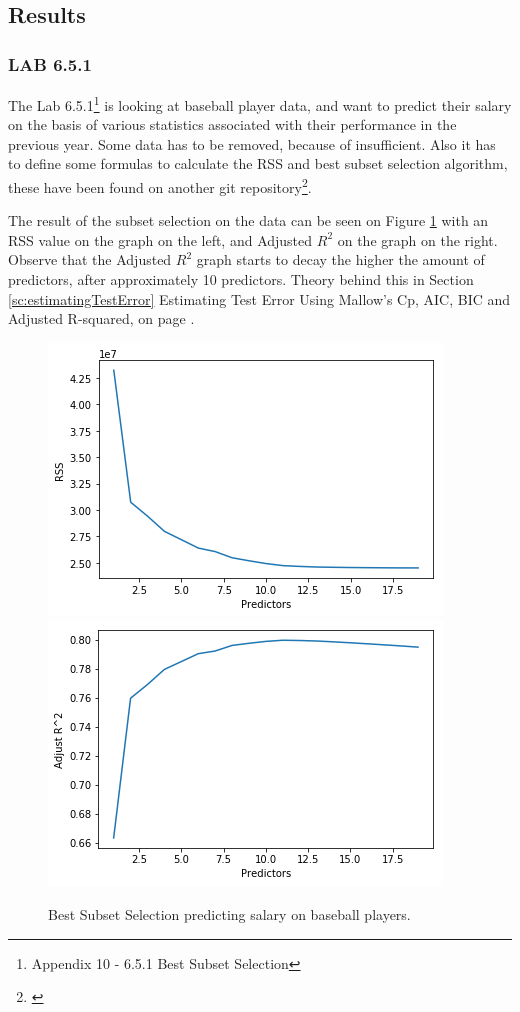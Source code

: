 \subsection{Results}
\subsubsection*{LAB 6.5.1}
The Lab 6.5.1\footnote{Appendix 10 - 6.5.1 Best Subset Selection} is looking at baseball player data, and want to predict their salary on the basis of various statistics associated with their performance in the previous year. Some data has to be removed, because of insufficient. Also it has to define some formulas to calculate the RSS and best subset selection algorithm, these have been found on another git repository\footnote{\cite{Xu2017}}.

The result of the subset selection on the data can be seen on Figure \ref{fig:bestSubsetSelection} with an RSS value on the graph on the left, and Adjusted $R^2$ on the graph on the right. Observe that the Adjusted $R^2$ graph starts to decay the higher the  amount of predictors, after approximately 10 predictors. Theory behind this in Section \ref{sc:estimatingTestError} Estimating Test Error Using Mallow's Cp, AIC, BIC and Adjusted R-squared, on page \pageref{sc:estimatingTestError}.

\begin{figure}[h]
	\centering
	\includegraphics[scale=0.5]{subsetSelection/selectionMethods/fig/bestSubsetSelectionRSS.png}
	\includegraphics[scale=0.5]{subsetSelection/selectionMethods/fig/bestSubsetSelectionRsquared.png}
	\caption{Best Subset Selection predicting salary on baseball players.}
	\label{fig:bestSubsetSelection}
\end{figure}


